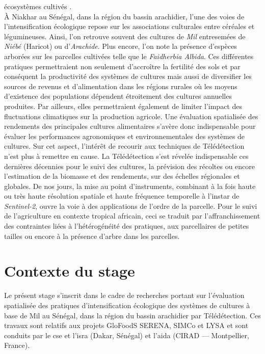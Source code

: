 écosystèmes cultivés \citep{Goulet2012}.\\ \`A Niakhar au Sénégal, dans la région du bassin arachidier, l'une des voies de l'intensification écologique repose sur les associations culturales 
entre céréales et légumineuses. Ainsi, l'on retrouve souvent des cultures de \emph{Mil} entresemées de \emph{Niébé} (Haricot) ou d'\emph{Arachide}. Plus encore, l'on note la 
présence d'espèces arborées sur les parcelles cultivées telle que le \emph{Faidherbia Albida}. Ces différentes pratiques permettraient non seulement d’accroître la fertilité des 
sols et par conséquent la productivité des systèmes de cultures mais aussi de diversifier les sources de revenus et d’alimentation dans les régions rurales où les moyens d’existence
des populations dépendent étroitement des cultures annuelles produites. Par ailleurs, elles permettraient également de limiter l’impact des fluctuations climatiques sur la 
production agricole. Une évaluation spatialisée des rendements des principales cultures alimentaires s'avère donc indispensable pour évaluer les performances agronomiques et 
environnementales des systèmes de cultures. Sur cet aspect, l'intérêt de recourir aux techniques de Télédétection n'est plus à remettre en cause. La Télédétection s'est révelée 
indispensable ces dernières décennies pour le suivi des cultures, la prévision des récoltes ou encore l'estimation de la biomasse et des rendements, sur des échelles régionales et 
globales. De nos jours, la mise au point d'instruments, combinant à la fois haute ou très haute résolution spatiale et haute fréquence temporelle à l'instar de \emph{Sentinel-2}, ouvre la
voie à des applications de l'ordre de la parcelle. Pour le suivi de l'agriculture en contexte tropical africain, ceci se traduit par l'affranchissement des contraintes liées à 
l'hétérogénéité des pratiques, aux parcellaires de petites tailles ou encore à la présence d’arbre dans les parcelles. 

\section{Contexte du stage}

Le présent stage s'inscrit dans le cadre de recherches portant sur l’évaluation spatialisée des pratiques d’intensification écologique des systèmes de cultures à base de Mil au 
Sénégal, dans la région du bassin arachidier par Télédétection. Ces travaux sont relatifs aux projets GloFoodS SERENA, SIMCo et LYSA et sont conduits par le \acrshort{cse} et 
l'\acrshort{isra} (Dakar, Sénégal) et l'\acrshort{aida} (CIRAD --- Montpellier, France).

